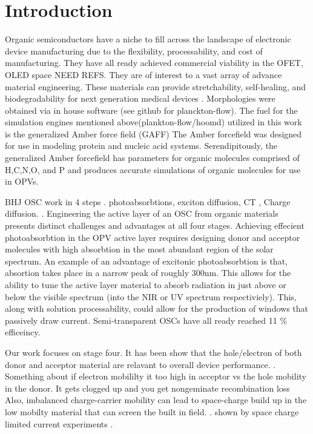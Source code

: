 \chapter{Introduction} 
\indent Organic semiconductors have a niche to fill across the landscape of electronic
device manufacturing due to the flexibility, processability, and cost of manufacturing. They have all ready
achieved commercial viability in the OFET, OLED space NEED REFS. They are of interest to a vast array of
advance material engineering. These materials can
provide stretchability, self-healing, and biodegradability for next generation medical devices
\cite{Brutting2006}.  Morphologies were obtained via in house software (see github for planckton-flow).  The
fuel for the simulation engines mentioned above(plankton-flow/hoomd) utilized in this work is the generalized
Amber force field (GAFF)\cite{Wang2004a} The Amber forcefield was designed for use in modeling protein and
nucleic acid systems.  Serendipitously, the generalized Amber forcefield has parameters for organic molecules
comprised of H,C,N,O, and P and produces accurate simulations of organic molecules for use in OPVs.  

BHJ OSC work in 4 steps . photoabsorbtions, exciton diffusion, CT , Charge diffusion. \citet{Fusella2019}.
Engineering the active layer of an OSC from organic materials presents distinct challenges and advantages at
all four stages. Achieving effecient photoabsorbtion in the OPV active layer requires designing donor and
acceptor molecules with high absorbtion in the most abundant region of the solar spectrum. An example
of an advantage of excitonic photoabsorbtion is that, absortion takes place in a narrow peak of roughly 300nm.
This allows for the ability to tune the active layer material to absorb radiation in just above or below the
visible spectrum (into the NIR or UV spectrum respectiviely). This, along with solution processability, 
could allow for the production of windows that passively draw current. Semi-transparent OSCs have all ready
reached 11 \% efficeincy. \cite{Brabec2020}

\indent Our work focuses on stage four. It has been show that the hole/electron of both donor and acceptor material are
relavant to overall device performance. \cite{Wang2019e}.  Something about if electron mobililty it too high
in acceptor vs the hole mobility in the donor. It gets clogged up and you get nongeminate recombination loss
Also, imbalanced charge-carrier mobility can lead to space-charge build up in the low mobilty material that
can screen the built in field.  \cite{Bartelt2015}. shown by space charge limited current experiments
\cite{Small2013}.

